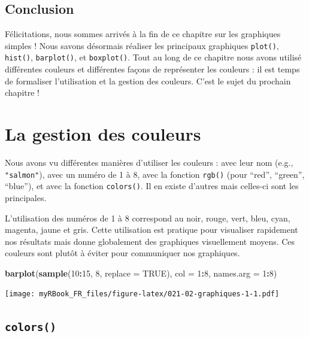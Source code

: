 \documentclass[]{book}
\newenvironment{Shaded}{\begin{snugshade}}{\end{snugshade}}
\newcommand{\DataTypeTok}[1]{\textcolor[rgb]{0.13,0.29,0.53}{#1}}
\newcommand{\DecValTok}[1]{\textcolor[rgb]{0.00,0.00,0.81}{#1}}
\newcommand{\KeywordTok}[1]{\textcolor[rgb]{0.13,0.29,0.53}{\textbf{#1}}}
\newcommand{\NormalTok}[1]{#1}
\newcommand{\OperatorTok}[1]{\textcolor[rgb]{0.81,0.36,0.00}{\textbf{#1}}}
\newcommand{\OtherTok}[1]{\textcolor[rgb]{0.56,0.35,0.01}{#1}}
\begin{document}
\hypertarget{conclusion-8}{%
\section{Conclusion}\label{conclusion-8}}

Félicitations, nous sommes arrivés à la fin de ce chapitre sur les graphiques simples ! Nous savons désormais réaliser les principaux graphiques \texttt{plot()}, \texttt{hist()}, \texttt{barplot()}, et \texttt{boxplot()}. Tout au long de ce chapitre nous avons utilisé différentes couleurs et différentes façons de représenter les couleurs : il est temps de formaliser l'utilisation et la gestion des couleurs. C'est le sujet du prochain chapitre !

\hypertarget{graph2}{%
\chapter{La gestion des couleurs}\label{graph2}}

Nous avons vu différentes manières d'utiliser les couleurs : avec leur nom (e.g., \texttt{"salmon"}), avec un numéro de 1 à 8, avec la fonction \texttt{rgb()} (pour ``red'', ``green'', ``blue''), et avec la fonction \texttt{colors()}. Il en existe d'autres mais celles-ci sont les principales.

L'utilisation des numéros de 1 à 8 correspond au noir, rouge, vert, bleu, cyan, magenta, jaune et gris. Cette utilisation est pratique pour visualiser rapidement nos résultats mais donne globalement des graphiques visuellement moyens. Ces couleurs sont plutôt à éviter pour communiquer nos graphiques.

\begin{Shaded}
\begin{Highlighting}[]
\KeywordTok{barplot}\NormalTok{(}\KeywordTok{sample}\NormalTok{(}\DecValTok{10}\OperatorTok{:}\DecValTok{15}\NormalTok{, }\DecValTok{8}\NormalTok{, }\DataTypeTok{replace =} \OtherTok{TRUE}\NormalTok{), }\DataTypeTok{col =} \DecValTok{1}\OperatorTok{:}\DecValTok{8}\NormalTok{, }\DataTypeTok{names.arg =} \DecValTok{1}\OperatorTok{:}\DecValTok{8}\NormalTok{)}
\end{Highlighting}
\end{Shaded}

\texttt{[image: myRBook\_FR\_files/figure-latex/021-02-graphiques-1-1.pdf]}

\hypertarget{colors}{%
\section{\texorpdfstring{\texttt{colors()}}{colors()}}\label{colors}}
\end{document}
